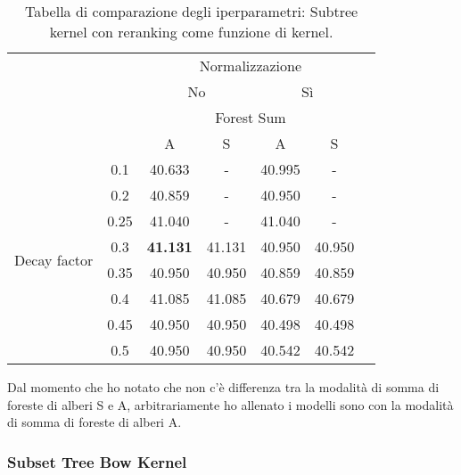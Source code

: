 \begin{table}[H]
    \centering
    \begin{tabular}{cc|ccccc}
        \toprule
        & & \multicolumn{4}{c}{Normalizzazione}                         \\
        & & \multicolumn{2}{c}{No} & \multicolumn{2}{c}{Sì}             \\
        \hline
        & & \multicolumn{4}{c}{Forest Sum}                              \\
        & & A & S & A & S                                               \\
        \hline
        \multirow{8}{*}{\begin{sideways}Decay factor\end{sideways}} 
        & 0.1   & 40.633            & -         & 40.995    & -         \\
        & 0.2   & 40.859            & -         & 40.950    & -         \\
        & 0.25  & 41.040            & -         & 41.040    & -         \\
        & 0.3   & \textbf{41.131}   & 41.131    & 40.950    & 40.950    \\
        & 0.35  & 40.950            & 40.950    & 40.859    & 40.859    \\
        & 0.4   & 41.085            & 41.085    & 40.679    & 40.679    \\
        & 0.45  & 40.950            & 40.950    & 40.498    & 40.498    \\
        & 0.5   & 40.950            & 40.950    & 40.542    & 40.542    \\
        \bottomrule
    \end{tabular}
    \caption{Tabella di comparazione degli iperparametri: Subtree kernel con
    reranking come funzione di kernel.}
\end{table}

Dal momento che ho notato che non c'è differenza tra la modalità di somma di
foreste di alberi S e A, arbitrariamente ho allenato i modelli sono con la
modalità di somma di foreste di alberi A.

\subsubsection{Subset Tree Bow Kernel}

